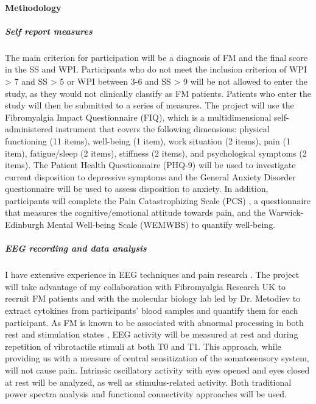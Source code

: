 \documentclass[twocolumn,  rga,issue, numeric]{jote-new-article}
\begin{document}
\noindent\paragraph{\noindent Methodology}



\subparagraph{Self report measures}


The main criterion for participation will be a diagnosis of FM and the
final score in the SS and WPI. Participants who do not meet the
inclusion criterion of WPI \textgreater{} 7 and SS \textgreater{} 5 or
WPI between 3-6 and SS \textgreater{} 9 will be not allowed to enter the
study, as they would not clinically classify as FM patients. Patients
who enter the study will then be submitted to a series of measures. The
project will use the Fibromyalgia Impact Questionnaire (FIQ), which is a
multidimensional self-administered instrument that covers the following
dimensions: physical functioning (11 items), well-being (1 item), work
situation (2 items), pain (1 item), fatigue/sleep (2 items), stiffness
(2 items), and psychological symptoms (2 items). The Patient Health
Questionnaire (PHQ-9) will be used to investigate current disposition to
depressive symptoms \cite{Kroenke2002} and the General Anxiety Disorder
questionnaire \cite{Spitzer2006} will be used to assess disposition to
anxiety. In addition, participants will complete the Pain
Catastrophizing Scale (PCS) \cite{Sullivan1995}, a questionnaire that
measures the cognitive/emotional attitude towards pain, and the
Warwick-Edinburgh Mental Well-being Scale (WEMWBS) \cite{Tennant2007}
to quantify well-being.


\subparagraph{EEG recording and data analysis}

I have extensive experience in EEG techniques and pain
research \cite{Legrain2012,Torta2017}. The project will take advantage of my
collaboration with Fibromyalgia Research UK to recruit FM patients and
with the molecular biology lab led by Dr. Metodiev to extract cytokines
from participants' blood samples and quantify them for each participant.
As FM is known to be associated with abnormal processing in both rest
and stimulation states \cite{Sluka2016}, EEG activity will be measured
at rest and during repetition of vibrotactile stimuli at both T0 and T1.
This approach, while providing us with a measure of central
sensitization of the somatosensory system, will not cause pain.
Intrinsic oscillatory activity with eyes opened and eyes closed at rest
will be analyzed, as well as stimulus-related activity. Both traditional
power spectra analysis and functional connectivity approaches will be
used.
\end{document}
